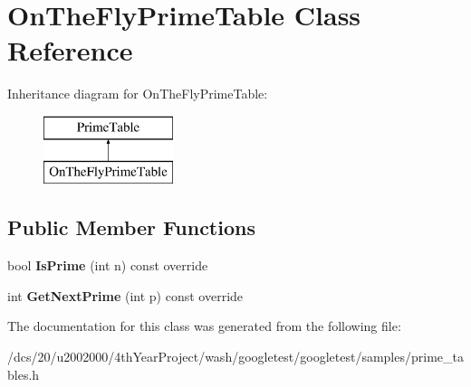 \hypertarget{classOnTheFlyPrimeTable}{}\section{On\+The\+Fly\+Prime\+Table Class Reference}
\label{classOnTheFlyPrimeTable}
Inheritance diagram for On\+The\+Fly\+Prime\+Table\+:\begin{figure}[H]
\begin{center}
\leavevmode
\includegraphics[height=2.000000cm]{classOnTheFlyPrimeTable}
\end{center}
\end{figure}
\subsection*{Public Member Functions}
\begin{DoxyCompactItemize}
\item 
\mbox{\label{classOnTheFlyPrimeTable_ac8236514299e4558a5220c3e06f7f61a}} 
bool {\bfseries Is\+Prime} (int n) const override
\item 
\mbox{\label{classOnTheFlyPrimeTable_a0f6f934f318407a812098e67584b60bf}} 
int {\bfseries Get\+Next\+Prime} (int p) const override
\end{DoxyCompactItemize}


The documentation for this class was generated from the following file\+:\begin{DoxyCompactItemize}
\item 
/dcs/20/u2002000/4th\+Year\+Project/wash/googletest/googletest/samples/prime\+\_\+tables.\+h\end{DoxyCompactItemize}

